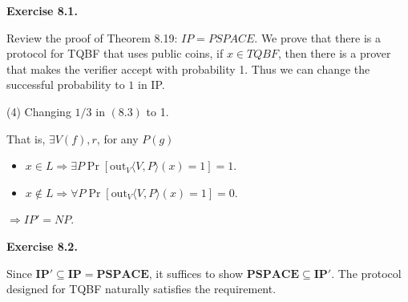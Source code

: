 \documentclass[a4paper]{article}
\newenvironment{exercise}[1]{
	\par
	\noindent\textbf{Exercise #1.}\quad
}{
	\par
	\bigskip
}
\begin{document}
\begin{exercise}{8.1}
	Review the proof of Theorem 8.19: $IP = PSPACE$. We prove that there is a protocol for TQBF that uses public coins, if $x\in TQBF$, then there is a prover that makes the verifier accept with probability 1. Thus we can change the successful probability to $1$ in IP.

	(4) Changing $1/3$ in $(8.3)$ to 1.

	That is, $\exists V (f), r$, for any $P (g)$
	\begin{itemize}
	\item $x \in L \Rightarrow \exists P\Pr[\text{out}_{V}\langle{V,P}\rangle(x) = 1] = 1$. 
	\item $x \not\in L \Rightarrow \forall P \Pr[\text{out}_{V}\langle{V,P}\rangle(x) = 1]  =0$.  
	\end{itemize}
	$\Rightarrow IP' = NP$.
	\end{exercise}

	\begin{exercise}{8.2}
	    Since $\textbf{IP}'\subseteq\textbf{IP}=\textbf{PSPACE}$, it suffices to show $\textbf{PSPACE}\subseteq\textbf{IP}'$.
	    The protocol designed for TQBF naturally satisfies the requirement.
	\end{exercise}
\end{document}
